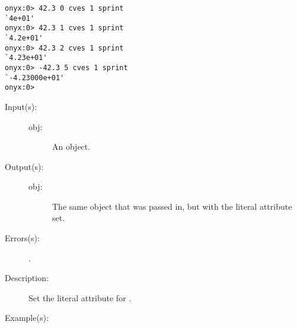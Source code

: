 \begin{description}
\begin{description}
\begin{verbatim}
onyx:0> 42.3 0 cves 1 sprint
`4e+01'
onyx:0> 42.3 1 cves 1 sprint
`4.2e+01'
onyx:0> 42.3 2 cves 1 sprint
`4.23e+01'
onyx:0> -42.3 5 cves 1 sprint
`-4.23000e+01'
onyx:0>
		\end{verbatim}
	\end{description}
\label{systemdict:cvl}
\item[{\onyxop{obj}{cvl}{obj}}: ]
	\begin{description}\item[]
	\item[Input(s): ]
		\begin{description}\item[]
		\item[obj: ]
			An object.
		\end{description}
	\item[Output(s): ]
		\begin{description}\item[]
		\item[obj: ]
			The same object that was passed in, but with the literal
			attribute set.
		\end{description}
	\item[Errors(s): ]
		\begin{description}\item[]
		\item[.]
		\end{description}
	\item[Description: ]
		Set the literal attribute for .
	\item[Example(s): ]\begin{verbatim}


\end{verbatim}
\end{description}
\end{description}
